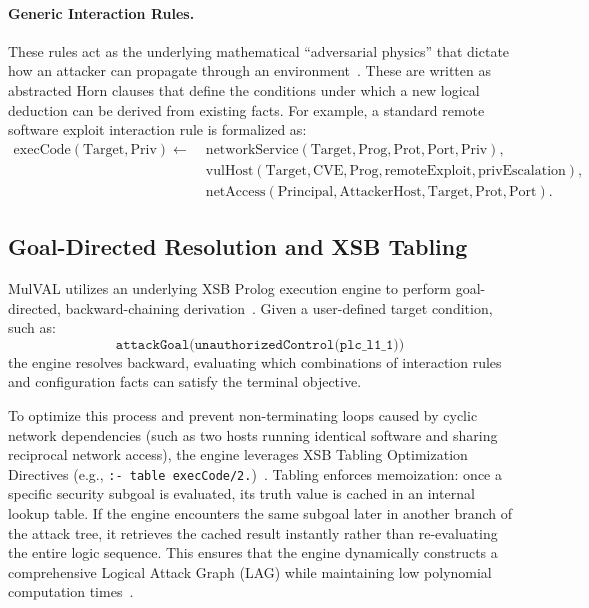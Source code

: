 \documentclass[target=mst,aauheader=aics,style=]{thud}
\begin{document}
\paragraph{Generic Interaction Rules.} These rules act as the underlying mathematical ``adversarial physics'' that dictate how an attacker can propagate through an environment~\cite{Ou05}. These are written as abstracted Horn clauses that define the conditions under which a new logical deduction can be derived from existing facts. For example, a standard remote software exploit interaction rule is formalized as:
\begin{equation}
\begin{aligned}
\text{execCode}(\text{Target}, \text{Priv}) \leftarrow \; & \text{networkService}(\text{Target}, \text{Prog}, \text{Prot}, \text{Port}, \text{Priv}), \\
& \text{vulHost}(\text{Target}, \text{CVE}, \text{Prog}, \text{remoteExploit}, \text{privEscalation}), \\
& \text{netAccess}(\text{Principal}, \text{AttackerHost}, \text{Target}, \text{Prot}, \text{Port}).
\end{aligned}
\end{equation}

\subsection{Goal-Directed Resolution and XSB Tabling}
\label{sec:xsb_tabling_mechanics}
MulVAL utilizes an underlying XSB Prolog execution engine to perform goal-directed, backward-chaining derivation~\cite{swift2012xsb}. Given a user-defined target condition, such as:
\begin{equation}
\texttt{attackGoal(unauthorizedControl(plc\_l1\_1))}
\end{equation}
the engine resolves backward, evaluating which combinations of interaction rules and configuration facts can satisfy the terminal objective.

To optimize this process and prevent non-terminating loops caused by cyclic network dependencies (such as two hosts running identical software and sharing reciprocal network access), the engine leverages XSB Tabling Optimization Directives (e.g., \texttt{:- table execCode/2.})~\cite{swift2012xsb}. Tabling enforces memoization: once a specific security subgoal is evaluated, its truth value is cached in an internal lookup table. If the engine encounters the same subgoal later in another branch of the attack tree, it retrieves the cached result instantly rather than re-evaluating the entire logic sequence. This ensures that the engine dynamically constructs a comprehensive Logical Attack Graph (LAG) while maintaining low polynomial computation times~\cite{Ou05}.
\end{document}
